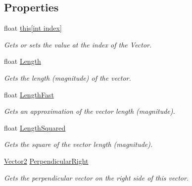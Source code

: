 \subsection*{Properties}
\begin{DoxyCompactItemize}
\item 
float \hyperlink{struct_open_t_k_1_1_vector2_a43319657b1c446e2b969e8123a1a0521}{this\mbox{[}int index\mbox{]}}
\begin{DoxyCompactList}\small\item\em Gets or sets the value at the index of the Vector. \end{DoxyCompactList}\item 
float \hyperlink{struct_open_t_k_1_1_vector2_a4e59d4f3f2a003e47705241fb3018023}{Length}
\begin{DoxyCompactList}\small\item\em Gets the length (magnitude) of the vector. \end{DoxyCompactList}\item 
float \hyperlink{struct_open_t_k_1_1_vector2_a3ca5088bcfc730ee241e3851ac49eab4}{Length\-Fast}
\begin{DoxyCompactList}\small\item\em Gets an approximation of the vector length (magnitude). \end{DoxyCompactList}\item 
float \hyperlink{struct_open_t_k_1_1_vector2_aba3ddfbb5955550d76df2b9f1bed585c}{Length\-Squared}
\begin{DoxyCompactList}\small\item\em Gets the square of the vector length (magnitude). \end{DoxyCompactList}\item 
\hyperlink{struct_open_t_k_1_1_vector2}{Vector2} \hyperlink{struct_open_t_k_1_1_vector2_aa1d47fbd2f965d0bd84d1d404da1fb9a}{Perpendicular\-Right}
\begin{DoxyCompactList}\small\item\em Gets the perpendicular vector on the right side of this vector. \end{DoxyCompactList}\item 

\end{DoxyCompactItemize}
